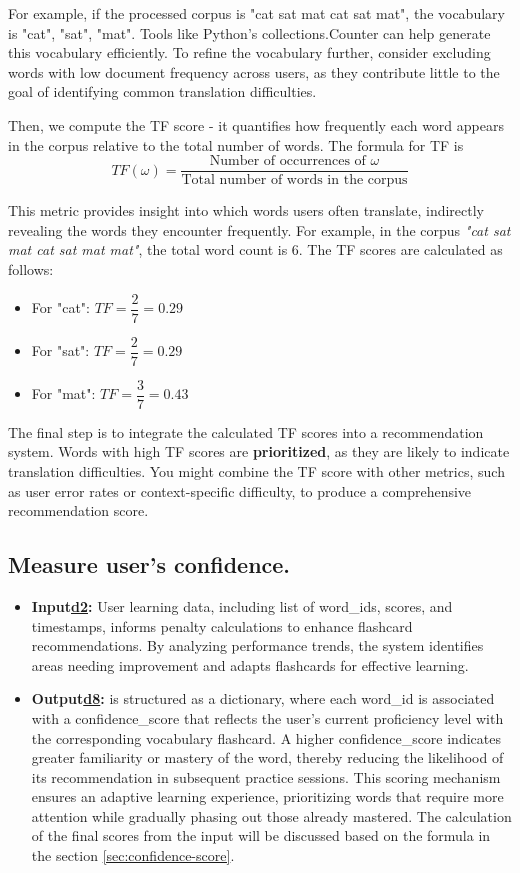 \documentclass{article}
\begin{document}
For example, if the processed corpus is "cat sat mat cat sat mat", the vocabulary is {"cat", "sat", "mat"}. Tools like Python’s collections.Counter can help generate this vocabulary efficiently. To refine the vocabulary further, consider excluding words with low document frequency across users, as they contribute little to the goal of identifying common translation difficulties.

Then, we compute the TF score - it quantifies how frequently each word appears in the corpus relative to the total number of words. The formula for TF is
\[
TF(\omega)= 
\frac{
\text{Number of occurrences of $\omega$}
}{
\text{Total number of words in the corpus}
}
\]

This metric provides insight into which words users often translate, indirectly revealing the words they encounter frequently. For example, in the corpus \textit{"cat sat mat cat sat mat mat"}, the total word count is 6. The TF scores are calculated as follows:

\begin{itemize}
    \item For "cat": $TF=\dfrac{2}{7}=0.29$
    \item For "sat": $TF=\dfrac{2}{7}=0.29$
    \item For "mat": $TF=\dfrac{3}{7}=0.43$
\end{itemize}

The final step is to integrate the calculated TF scores into a recommendation system. Words with high TF scores are \textbf{prioritized}, as they are likely to indicate translation difficulties. You might combine the TF score with other metrics, such as user error rates or context-specific difficulty, to produce a comprehensive recommendation score.

\subsection{Measure user's confidence.}
\begin{itemize}
    \item \textbf{Input\hyperref[sec:input2]{d2}: }User learning data, including list of word\_ids, scores, and timestamps, informs penalty calculations to enhance flashcard recommendations. By analyzing performance trends, the system identifies areas needing improvement and adapts flashcards for effective learning.
    \label{sec:input8}
    \item \textbf{Output\hyperref[sec:input8]{d8}: }is structured as a dictionary, where each word\_id is associated with a confidence\_score that reflects the user’s current proficiency level with the corresponding vocabulary flashcard. A higher confidence\_score indicates greater familiarity or mastery of the word, thereby reducing the likelihood of its recommendation in subsequent practice sessions. This scoring mechanism ensures an adaptive learning experience, prioritizing words that require more attention while gradually phasing out those already mastered. The calculation of the final scores from the input will be discussed based on the formula in the section \ref{sec:confidence-score}.
\end{itemize}
\end{document}
